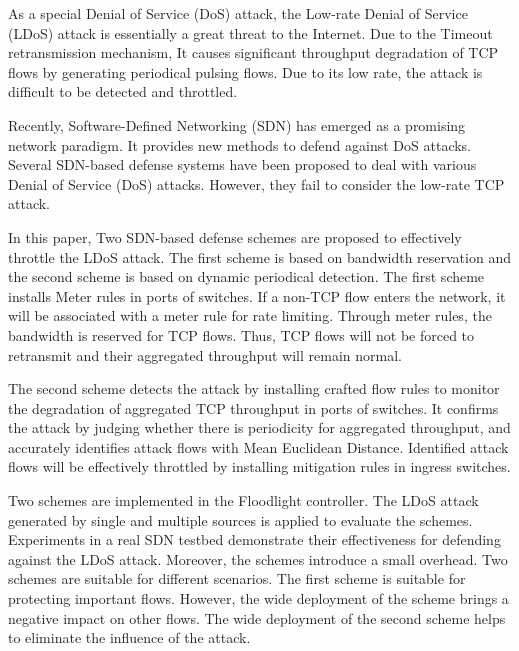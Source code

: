 \begin{eabstract}
  As a special Denial of Service (DoS) attack, the Low-rate Denial of Service (LDoS) attack is essentially a great threat to the Internet. Due to the Timeout retransmission mechanism, It causes significant throughput degradation of TCP flows by generating periodical pulsing flows. Due to its low rate, the attack is difficult to be detected and throttled.

  Recently, Software-Defined Networking (SDN) has emerged as a promising network paradigm. It provides new methods to defend against DoS attacks. Several SDN-based defense systems have been proposed to deal with various Denial of Service (DoS) attacks. However, they fail to consider the low-rate TCP attack.

  In this paper, Two SDN-based defense schemes are proposed to effectively throttle the LDoS attack. The first scheme is based on bandwidth reservation and the second scheme is based on dynamic periodical detection. The first scheme installs Meter rules in ports of switches. If a non-TCP flow enters the network, it will be associated with a meter rule for rate limiting. Through meter rules, the bandwidth is reserved for TCP flows. Thus, TCP flows will not be forced to retransmit and their aggregated throughput will remain normal. 


  The second scheme detects the attack by installing crafted flow rules to monitor the degradation of aggregated TCP throughput in ports of switches. It confirms the attack by judging whether there is periodicity for aggregated throughput, and accurately identifies attack flows with Mean Euclidean Distance. Identified attack flows will be effectively throttled by installing mitigation rules in ingress switches.

  Two schemes are implemented in the Floodlight controller. The LDoS attack generated by single and multiple sources is applied to evaluate the schemes.    Experiments in a real SDN testbed demonstrate their effectiveness for defending against the LDoS attack. Moreover, the schemes introduce a small overhead. Two schemes are suitable for different scenarios. The first scheme is suitable for protecting important flows. However, the wide deployment of the scheme brings a negative impact on other flows. The wide deployment of the second scheme helps to eliminate the influence of the attack.

\end{eabstract}

